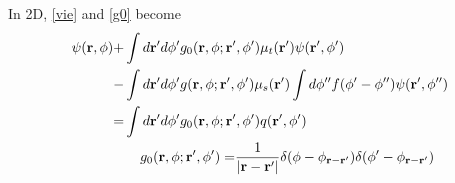 \documentclass[main]{subfiles}
\begin{document}
In 2D, \eqref{vie} and \eqref{g0} become
\begin{align} 
	\begin{split} 
		\label{2dvie}
		\psi(\mathbf{r},\phi) +& \int d\mathbf{r}^{\prime} d\phi^{\prime}
		g_0(\mathbf{r},\phi;\mathbf{r}^{\prime},\phi^{\prime})
		\mu_t(\mathbf{r}^{\prime})\psi(\mathbf{r}^{\prime},\phi^{\prime})
		\\
		-& \int d\mathbf{r}^{\prime} d\phi^{\prime} g(\mathbf{r},\phi;\mathbf{r}^{\prime},\phi^{\prime})
		\mu_s(\mathbf{r}^{\prime}) \int d\phi^{{\prime\prime}}
		f(\phi^{\prime}-\phi^{{\prime\prime}})\psi(\mathbf{r}^{\prime},\phi^{{\prime\prime}})
		\\
		=& \int d\mathbf{r}^{\prime} d\phi^{\prime}
		g_0(\mathbf{r},\phi;\mathbf{r}^{\prime},\phi^{\prime})q(\mathbf{r}^{\prime},\phi^{\prime})
	\end{split}
	\\
	\begin{split}
		\label{2dg0}
		g_0(\mathbf{r},\phi;\mathbf{r}^{\prime},\phi^{\prime}) =& \frac{1}{\left| \mathbf{r}-\mathbf{r}^{\prime} \right|} 
		\delta(\phi-\phi_{\mathbf{r}-\mathbf{r}^{\prime}})
		\delta(\phi^{\prime}-\phi_{\mathbf{r}-\mathbf{r}^{\prime}}) 
	\end{split}
\end{align}
\end{document}
